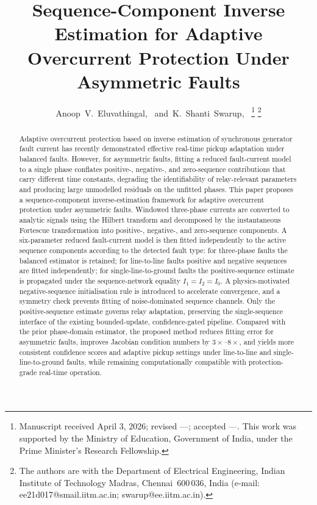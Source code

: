 \documentclass[10pt,journal,twoside]{IEEEtran}
\title{Sequence-Component Inverse Estimation for Adaptive Overcurrent
       Protection Under Asymmetric Faults}
\author{Anoop~V.~Eluvathingal,~\IEEEmembership{Student Member,~IEEE,}
        and~K.~Shanti~Swarup,~\IEEEmembership{Senior Member,~IEEE}%
\thanks{Manuscript received April 3, 2026; revised ---; accepted ---.
        This work was supported by the Ministry of Education, Government
        of India, under the Prime Minister's Research Fellowship.}%
\thanks{The authors are with the Department of Electrical Engineering,
        Indian Institute of Technology Madras, Chennai~600\,036, India
        (e-mail: ee21d017@smail.iitm.ac.in; swarup@ee.iitm.ac.in).}}
\begin{document}

\maketitle

\begin{abstract}
Adaptive overcurrent protection based on inverse estimation of synchronous
generator fault current has recently demonstrated effective real-time pickup
adaptation under balanced faults.  However, for asymmetric faults, fitting
a reduced fault-current model to a single phase conflates positive-, negative-,
and zero-sequence contributions that carry different time constants, degrading
the identifiability of relay-relevant parameters and producing large
unmodelled residuals on the unfitted phases.  This paper proposes a
sequence-component inverse-estimation framework for adaptive overcurrent
protection under asymmetric faults.  Windowed three-phase currents are
converted to analytic signals using the Hilbert transform and decomposed by
the instantaneous Fortescue transformation into positive-, negative-, and
zero-sequence components.  A six-parameter reduced fault-current model is
then fitted independently to the active sequence components according to
the detected fault type: for three-phase faults the balanced estimator is
retained; for line-to-line faults positive and negative sequences are fitted
independently; for single-line-to-ground faults the positive-sequence estimate
is propagated under the sequence-network equality $I_1 = I_2 = I_0$.
A physics-motivated negative-sequence initialisation rule is introduced to
accelerate convergence, and a symmetry check prevents fitting of noise-dominated
sequence channels.  Only the positive-sequence estimate governs relay
adaptation, preserving the single-sequence interface of the existing
bounded-update, confidence-gated pipeline.  Compared with the prior
phase-domain estimator, the proposed method reduces fitting error for
asymmetric faults, improves Jacobian condition numbers by
$3\times$--$8\times$, and yields more consistent confidence scores and
adaptive pickup settings under line-to-line and single-line-to-ground
faults, while remaining computationally compatible with
protection-grade real-time operation.
\end{abstract}
\end{document}
